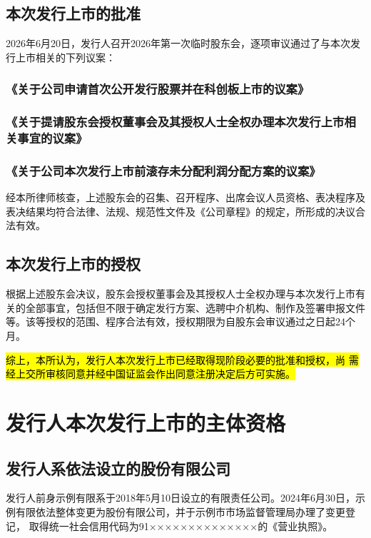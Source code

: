 \documentclass[zihao=-4]{ctexart}   %
\begin{document}
\subsection{本次发行上市的批准}

2026年6月20日，发行人召开2026年第一次临时股东会，逐项审议通过了与本次发
行上市相关的下列议案：

\subsubsection{《关于公司申请首次公开发行股票并在科创板上市的议案》}

\subsubsection{《关于提请股东会授权董事会及其授权人士全权办理本次发行上市相关事宜的议案》}

\subsubsection{《关于公司本次发行上市前滚存未分配利润分配方案的议案》}

经本所律师核查，上述股东会的召集、召开程序、出席会议人员资格、表决程序及
表决结果均符合法律、法规、规范性文件及《公司章程》的规定，所形成的决议合
法有效。

\subsection{本次发行上市的授权}

根据上述股东会决议，股东会授权董事会及其授权人士全权办理与本次发行上市有
关的全部事宜，包括但不限于确定发行方案、选聘中介机构、制作及签署申报文件
等。该等授权的范围、程序合法有效，授权期限为自股东会审议通过之日起24个月。

\hl{综上，本所认为，发行人本次发行上市已经取得现阶段必要的批准和授权，尚
需经上交所审核同意并经中国证监会作出同意注册决定后方可实施。}

\section{发行人本次发行上市的主体资格}

\subsection{发行人系依法设立的股份有限公司}

发行人前身示例有限系于2018年5月10日设立的有限责任公司。2024年6月30日，示
例有限依法整体变更为股份有限公司，并于示例市市场监督管理局办理了变更登记，
取得统一社会信用代码为91××××××××××××××的《营业执照》。
\end{document}
